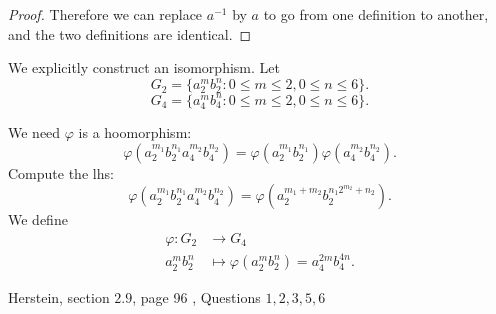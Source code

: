 \begin{enumerate}
\begin{proof}
	Therefore we can replace $a^{-1} $ by $a$ to go from one definition to another, and the two definitions are identical.
\end{proof}
\begin{correction}
	We explicitly construct an isomorphism. Let 
\[
		G_2 = \{a_2 ^m b_2^n: 0\le m\le 2, 0\le n\le 6\} 
	.\]
	\[
		G_4 = \{a_4 ^m b_4^n: 0\le m\le 2, 0\le n\le 6\} 
	.\] 

	We need $\varphi$ is a hoomorphism:
	\[
		\varphi(a_2^{m_1}b_2^{n_1} a_4^{m_2}b_4^{n_2}) = \varphi(a_2^{m_1}b_2^{n_1})\varphi( a_4^{m_2}b_4^{n_2})
	.\] 
	Compute the lhs: \[
		\varphi(a_2^{m_1}b_2^{n_1} a_4^{m_2}b_4^{n_2}) = \varphi(a_2^{m_1+m_2}b_2^{n_1 2^{m_2} + n_2})
	.\] 
	We define
	\begin{align*}
		\varphi: G_2 &\longrightarrow G_4 \\
		a_2^m b_2^n &\longmapsto \varphi(a_2^m b_2^n) = a_4^{2m}b_4^{4n}
	.\end{align*}
\end{correction}




\end{enumerate}
Herstein, section $2.9$, page 96 , Questions $1,2,3,5,6$
